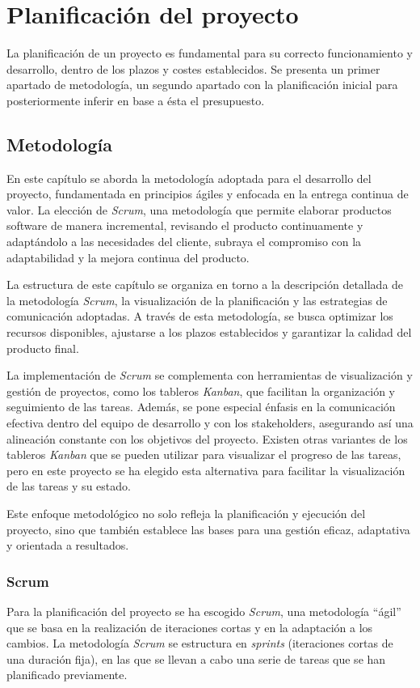 \chapter{Planificación del proyecto}\label{chap:planif}
La planificación de un proyecto es fundamental para su correcto funcionamiento y
desarrollo, dentro de los plazos y costes establecidos. Se presenta un primer
apartado de metodología, un segundo apartado con la planificación inicial para
posteriormente inferir en base a ésta el presupuesto.


\section{Metodología}\label{sec:metodología}
En este capítulo se aborda la metodología adoptada para el desarrollo del
proyecto, fundamentada en principios ágiles y enfocada en la entrega continua de
valor. La elección de \textit{Scrum}, una metodología que permite elaborar
productos software de manera incremental, revisando el producto continuamente y
adaptándolo a las necesidades del cliente, subraya el compromiso con la
adaptabilidad y la mejora continua del producto.

La estructura de este capítulo se organiza en torno a la descripción detallada
de la metodología \textit{Scrum}, la visualización de la planificación y las
estrategias de comunicación adoptadas. A través de esta metodología, se busca
optimizar los recursos disponibles, ajustarse a los plazos establecidos y
garantizar la calidad del producto final.

La implementación de \textit{Scrum} se complementa con herramientas de
visualización y gestión de proyectos, como los tableros \textit{Kanban}, que
facilitan la organización y seguimiento de las tareas. Además, se pone especial
énfasis en la comunicación efectiva dentro del equipo de desarrollo y con los
stakeholders, asegurando así una alineación constante con los objetivos del
proyecto. Existen otras variantes de los tableros \textit{Kanban} que se pueden
utilizar para visualizar el progreso de las tareas, pero en este proyecto se ha
elegido esta alternativa para facilitar la visualización de las tareas y su
estado.

Este enfoque metodológico no solo refleja la planificación y ejecución del
proyecto, sino que también establece las bases para una gestión eficaz,
adaptativa y orientada a resultados.


\newpage{}
\subsection{Scrum}\label{subsec:scrum}
Para la planificación del proyecto se ha escogido \textit{Scrum}, una
metodología ``ágil'' que se basa en la realización de iteraciones cortas y en la
adaptación a los cambios. La metodología \textit{Scrum} se estructura en
\textit{sprints} (iteraciones cortas de una duración fija), en las que se llevan
a cabo una serie de tareas que se han planificado previamente.

